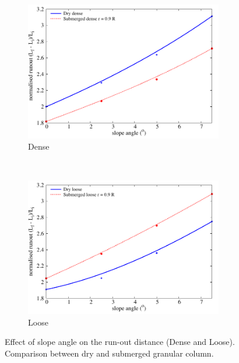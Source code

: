 \begin{figure}
	\centering
\begin{subfigure}[b]{0.95\textwidth}
	\centering
    \includegraphics[width=0.95\textwidth]{slope_runout_dense}
    \caption{Dense}
    \label{fig:slope_runout_dense}
\end{subfigure}\\
\begin{subfigure}[b]{0.95\textwidth}
	\centering
    \includegraphics[width=0.95\textwidth]{slope_runout_loose}
    \caption{Loose}
    \label{fig:slope_runout_loose}
\end{subfigure}
\caption{Effect of slope angle on the run-out distance (Dense and Loose). 
	Comparison between dry and submerged granular column.}
\label{fig:slope_loose_dense}
\end{figure}


